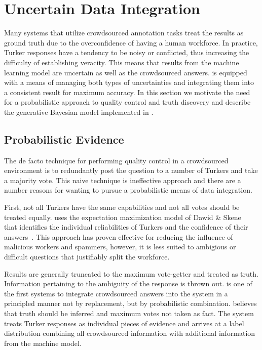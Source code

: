 
\section{Uncertain Data Integration}
\label{sec:integration}

Many systems that utilize crowdsourced annotation tasks treat the results as ground truth due to the overconfidence of having a human workforce.  In practice, Turker responses have a tendency to be noisy or conflicted, thus increasing the difficulty of establishing veracity.  This means that results from the machine learning model are uncertain as well as the crowdsourced answers.  \sysName is equipped with a means of managing both types of uncertainties and integrating them into a consistent result for maximum accuracy.  In this section we motivate the need for a probabilistic approach to quality control and truth discovery and describe the generative Bayesian model implemented in \sysName.

\subsection{Probabilistic Evidence}

The de facto technique for performing quality control in a crowdsourced environment is to redundantly post the question to a number of Turkers and take a majority vote.  This naive technique is ineffective approach and there are a number reasons for wanting to pursue a probabilistic means of data integration.  

First, not all Turkers have the same capabilities and not all votes should be treated equally.  \sysName uses the expectation maximization model of Dawid \& Skene~\cite{1979} that identifies the individual reliabilities of Turkers and the confidence of their answers~\cite{Ipeirotis:2010:QMA:1837885.1837906}.  This approach has proven effective for reducing the influence of malicious workers and spammers, however, it is less suited to ambigious or difficult questions that justifiably split the workforce.  

Results are generally truncated to the maximum vote-getter and treated as truth.  Information pertaining to the ambiguity of the response is thrown out. \sysName is one of the first systems to integrate crowdsourced answers into the system in a principled manner not by replacement, but by probabilistic combination.  \sysName believes that truth should be inferred and maximum votes not taken as fact. The system treats Turker responses as individual pieces of evidence and arrives at a label distribution combining all crowdsourced information with additional information from the machine model.  

